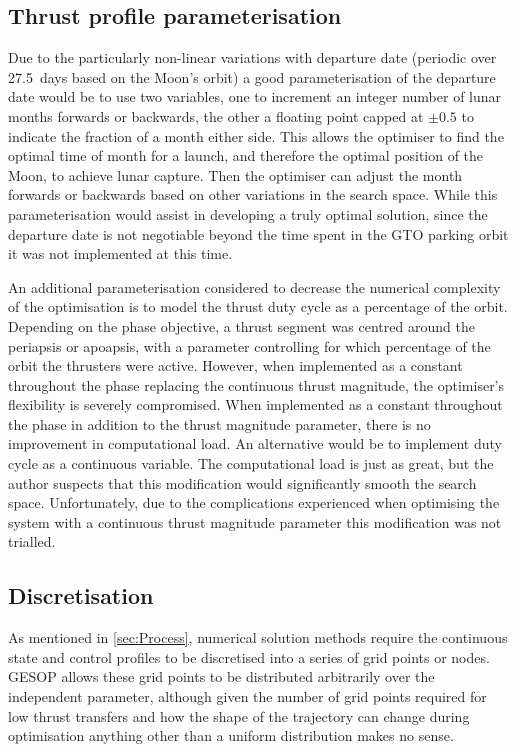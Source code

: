 \subsection{Thrust profile parameterisation} \label{sub:Thrust-parameterisation}

Due to the particularly non-linear variations with departure date (periodic over 27.5~days based on the Moon's orbit) a good parameterisation of the departure date would be to use two variables, one to increment an integer number of lunar months forwards or backwards, the other a floating point capped at $\pm 0.5$ to indicate the fraction of a month either side. This allows the optimiser to find the optimal time of month for a launch, and therefore the optimal position of the Moon, to achieve lunar capture. Then the optimiser can adjust the month forwards or backwards based on other variations in the search space. While this parameterisation would assist in developing a truly optimal solution, since the departure date is not negotiable beyond the time spent in the GTO parking orbit it was not implemented at this time.

An additional parameterisation considered to decrease the numerical complexity of the optimisation is to model the thrust duty cycle as a percentage of the orbit. Depending on the phase objective, a thrust segment was centred around the periapsis or apoapsis, with a parameter controlling for which percentage of the orbit the thrusters were active. However, when implemented as a constant throughout the phase replacing the continuous thrust magnitude, the optimiser's flexibility is severely compromised. When implemented as a constant throughout the phase in addition to the thrust magnitude parameter, there is no improvement in computational load. An alternative would be to implement duty cycle as a continuous variable. The computational load is just as great, but the author suspects that this modification would significantly smooth the search space. Unfortunately, due to the complications experienced when optimising the system with a continuous thrust magnitude parameter this modification was not trialled.


\subsection{Discretisation} \label{sub:Discretisation}
As mentioned in \autoref{sec:Process}, numerical solution methods require the continuous state and control profiles to be discretised into a series of grid points or nodes. GESOP allows these grid points to be distributed arbitrarily over the independent parameter, although given the number of grid points required for low thrust transfers and how the shape of the trajectory can change during optimisation anything other than a uniform distribution makes no sense.

